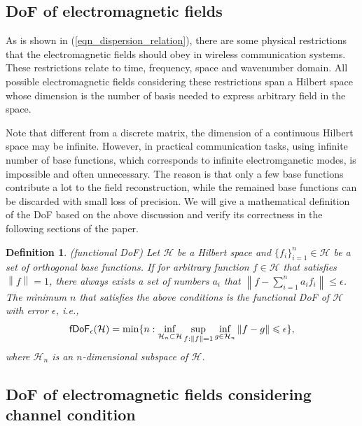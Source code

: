 \documentclass[12pt,draftclsnofoot,journal,onecolumn]{IEEEtran}
\newtheorem{definition}{Definition}
\begin{document}
{\color{red}
\subsection{DoF of electromagnetic fields}

As is shown in (\ref{eqn_dispersion_relation}), there are some physical restrictions that the electromagnetic fields should obey in wireless communication systems. These restrictions relate to time, frequency, space and wavenumber domain. All possible electromagnetic fields considering these restrictions span a Hilbert space whose dimension is the number of basis needed to express arbitrary field in the space. 

Note that different from a discrete matrix, the dimension of a continuous Hilbert space may be infinite. However, in practical communication tasks, using infinite number of base functions, which corresponds to infinite electromganetic modes, is impossible and often unnecessary. The reason is that only a few base functions contribute a lot to the field reconstruction, while the remained base functions can be discarded with small loss of precision. We will give a mathematical definition of the DoF based on the above discussion and verify its correctness in the following sections of the paper. 
}

\begin{definition}
		(functional DoF) Let $\mathcal{H}$ be a Hilbert space and $\{f_i\}_{i=1}^n \in \mathcal{H}$ be a set of orthogonal base functions. If for arbitrary function $f \in \mathcal{H}$ that satisfies $\left\| f \right\|=1$, there always exists a set of numbers $a_i$ that 
		$\left\| f-\sum_{i=1}^n a_i f_i  \right\| \leqslant \epsilon$. The minimum $n$ that satisfies the above conditions is the functional DoF of $\mathcal{H}$ with error $\epsilon$, i.e.,
		\begin{equation}
			\mathsf{fDoF}_{\epsilon} (\mathcal{H}) = {\rm min}\{ n: \underset{\mathcal{H}_n \subset \mathcal{H}}{\rm inf} \sup_{f: \left\| f \right\|=1} \inf_{g \in \mathcal{H}_n} \left\| f-g \right\| \leqslant \epsilon  \},
		\end{equation}
		where $\mathcal{H}_n$ is an $n$-dimensional subspace of $\mathcal{H}$.
	\end{definition}

\subsection{\color{red}DoF of electromagnetic fields considering channel condition}
\end{document}
